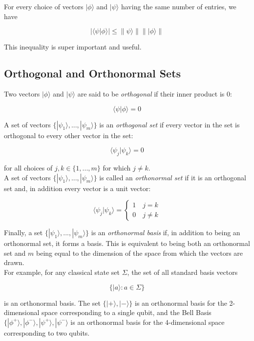 \documentclass[svgnames]{article}     %
\begin{document}
For every choice of vectors $|\phi\rangle $ and $|\psi\rangle $ having the same
number of entries, we have 

\[
  | \langle \psi | \phi \rangle | \leq \lVert \psi\rangle \rVert \lVert |\phi\rangle \rVert
\] \vspace{5px}

This inequality is super important and useful. 

\subsection{Orthogonal and Orthonormal Sets}

Two vectors $|\phi\rangle $ and $|\psi\rangle $ are said to be
\textit{orthogonal} if their inner product is 0: 

\[
\langle \psi | \phi \rangle = 0
\] \vspace{5px}

A set of vectors $\{ |\psi_1\rangle, ... , |\psi_m\rangle \} $ is an
\textit{orthogonal set} if every vector in the set is orthogonal to every other
vector in the set: 

\[
\langle \psi_j| \psi_k \rangle = 0
\] \vspace{5px}

for all choices of $j, k \in \{1, ... , m\}$ for which $j \neq k$. \\ 

A set of vectors $\{ |\psi_1\rangle , ... , |\psi_m\rangle \} $ is called an
\textit{orthonormal set} if it is an orthogonal set and, in addition every vector is a unit vector: 

\[
  \langle \psi_j | \psi_k \rangle = 
  \begin{cases}
    1 \quad j = k \\ 0 \quad j \neq k
  \end{cases}
\] \vspace{5px}

Finally, a set $\{ |\psi_1\rangle, ... , |\psi_m\rangle\} $ is an
  \textit{orthonormal basis} if, in addition to being an orthonormal set, it
  forms a basis. This is equivalent to being both an orthonormal set and $m$ 
  being equal to the dimension of the space from which the vectors are drawn.\\

For example, for any classical state set $\Sigma$, the set of all standard
basis vectors

\[
  \{ |a\rangle : a\in\Sigma \}
\] \vspace{5px}

is an orthonormal basis. The set $\{|+\rangle, |-\rangle \}$ is an orthonormal
basis for the 2-dimensional space corresponding to a single qubit, and the Bell
Basis $\{|\phi^+\rangle , |\phi^-\rangle , |\psi^+\rangle , |\psi^-\rangle $ is
  an orthonormal basis for the 4-dimensional space corresponding to two qubits.
\end{document}
